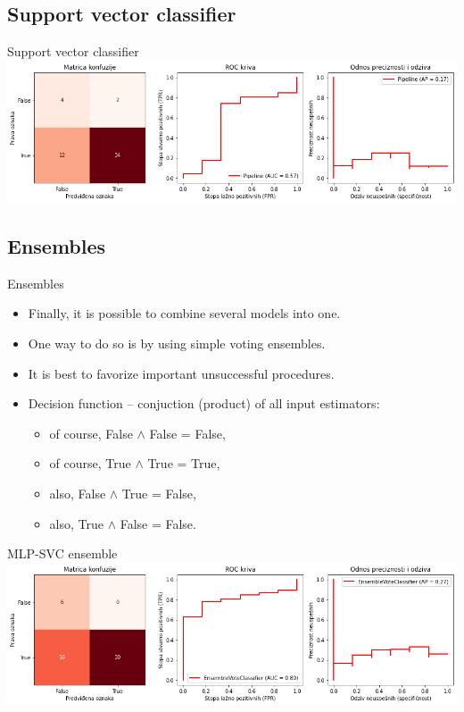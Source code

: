 \documentclass[hyperref={bookmarks=false}]{beamer}
\begin{document}
\subsection{Support vector classifier}
\begin{frame}{Support vector classifier}
\includegraphics[width=\textwidth]{svc.png}
\end{frame}

\subsection{Ensembles}
\begin{frame}{Ensembles}
\begin{itemize}
    \item Finally, it is possible to combine several models into one.
    \item One way to do so is by using simple voting ensembles.
    \item It is best to favorize important unsuccessful procedures.
    \item Decision function -- conjuction (product) of all input estimators:
    \begin{itemize}
        \item of course, False $\wedge$ False = False,
        \item of course, True $\wedge$ True = True,
        \item also, False $\wedge$ True = False,
        \item also, True $\wedge$ False = False.
    \end{itemize}
\end{itemize}
\end{frame}

\begin{frame}{MLP-SVC ensemble}
\includegraphics[width=\textwidth]{mlpsvc.png}
\end{frame}
\end{document}
